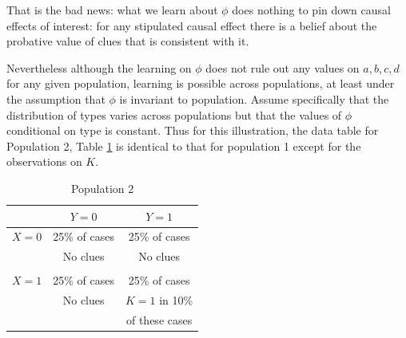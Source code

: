 \documentclass[12pt,]{book}
\begin{document}
That is the bad news: what we learn about \(\phi\) does nothing to pin down causal effects of interest: for any stipulated causal effect there is a belief about the probative value of clues that is consistent with it.

Nevertheless although the learning on \(\phi\) does not rule out any values on \(a,b,c,d\) for any given population, learning is possible across populations, at least under the assumption that \(\phi\) is invariant to population. Assume specifically that the distribution of types varies across populations but that the values of \(\phi\) conditional on type is constant. Thus for this illustration, the data table for Population 2, Table \ref{S2} is identical to that for population 1 except for the observations on \(K\).

\begin{table}[h!]
\centering
\begin{tabular}{c|cc}
           &        $Y=0$ &        $Y=1$ \\ \hline
       $X=0$ &     25\% of cases &     25\% of cases  \\
             & No clues & No clues \\ \\
       $X=1$ &     25\% of cases &     25\% of cases  \\
             & No clues & $K=1$ in 10\% \\
             &  & of these cases\\
\end{tabular}  
\caption{Population 2}
\label{S2} 
\end{table}
\end{document}
